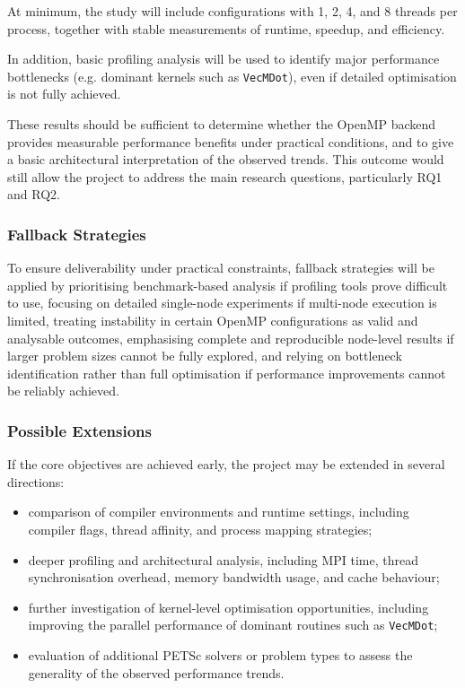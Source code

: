 \documentclass{article}
\begin{document}
At minimum, the study will include configurations with 1, 2, 4, and 8 threads per process, together with stable measurements of runtime, speedup, and efficiency.

In addition, basic profiling analysis will be used to identify major performance bottlenecks (e.g. dominant kernels such as \texttt{VecMDot}), even if detailed optimisation is not fully achieved.

These results should be sufficient to determine whether the OpenMP backend provides measurable performance benefits under practical conditions, and to give a basic architectural interpretation of the observed trends. 
This outcome would still allow the project to address the main research questions, particularly RQ1 and RQ2.

\subsubsection{Fallback Strategies}

To ensure deliverability under practical constraints, 
fallback strategies will be applied by prioritising benchmark-based 
analysis if profiling tools prove difficult to use, 
focusing on detailed single-node experiments if multi-node execution is limited, 
treating instability in certain OpenMP configurations as valid and analysable outcomes, 
emphasising complete and reproducible node-level results if larger problem sizes cannot be fully explored, 
and relying on bottleneck identification rather than full optimisation if performance improvements cannot be reliably achieved.

\subsubsection{Possible Extensions}

If the core objectives are achieved early, the project may be extended in several directions:

\begin{itemize}
    \item comparison of compiler environments and runtime settings, including compiler flags, thread affinity, and process mapping strategies;
    
    \item deeper profiling and architectural analysis, including MPI time, thread synchronisation overhead, memory bandwidth usage, and cache behaviour;

    \item further investigation of kernel-level optimisation opportunities, including improving the parallel performance of dominant routines such as \texttt{VecMDot};

    \item evaluation of additional PETSc solvers or problem types to assess the generality of the observed performance trends.
\end{itemize}
\end{document}
